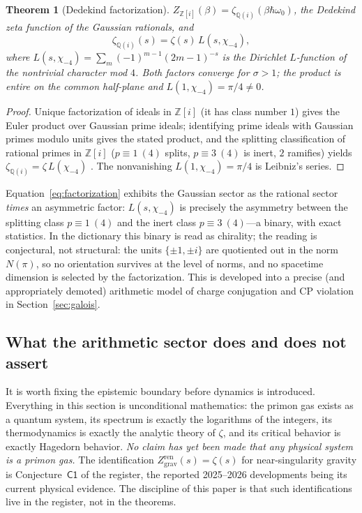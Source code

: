 \documentclass[11pt,a4paper]{article}
\theoremstyle{plain}
\newtheorem{theorem}{Theorem}[section]
\theoremstyle{definition}
\theoremstyle{remark}
\newcommand{\Zz}{\mathbb{Z}}
\newcommand{\Qq}{\mathbb{Q}}
\begin{document}
\begin{theorem}[Dedekind factorization]\label{thm:dedekind}
$Z_{\Zz[i]}(\beta)=\zeta_{\Qq(i)}(\beta\hbar\omega_{0})$, the Dedekind zeta function of the
Gaussian rationals, and
\begin{equation}\label{eq:factorization}
\zeta_{\Qq(i)}(s)=\zeta(s)\,L(s,\chi_{-4}),
\end{equation}
where $L(s,\chi_{-4})=\sum_{m}(-1)^{m-1}(2m-1)^{-s}$ is the Dirichlet $L$-function of the
nontrivial character mod $4$. Both factors converge for $\sigma>1$; the product is
entire on the common half-plane and $L(1,\chi_{-4})=\pi/4\neq 0$.
\end{theorem}

\begin{proof}
Unique factorization of ideals in $\Zz[i]$ (it has class number $1$) gives the Euler product
over Gaussian prime ideals; identifying prime ideals with Gaussian primes modulo units gives
the stated product, and the splitting classification of rational primes in $\Zz[i]$
($p\equiv1\ (4)$ splits, $p\equiv3\ (4)$ is inert, $2$ ramifies) yields
$\zeta_{\Qq(i)}=\zeta\,L(\chi_{-4})$ \cite{neukirch1999}. The nonvanishing
$L(1,\chi_{-4})=\pi/4$ is Leibniz's series.
\end{proof}

Equation~\eqref{eq:factorization} exhibits the Gaussian sector as the rational sector
\emph{times} an asymmetric factor: $L(s,\chi_{-4})$ is precisely the asymmetry between the
splitting class $p\equiv1\ (4)$ and the inert class $p\equiv3\ (4)$---a binary, with exact
statistics. In the dictionary this binary is read as chirality; the reading is conjectural,
not structural: the units $\{\pm1,\pm i\}$ are quotiented out in the norm $N(\pi)$, so no
orientation survives at the level of norms, and no spacetime dimension is selected by the
factorization. This is developed into a precise
(and appropriately demoted) arithmetic model of charge conjugation and CP violation in
Section~\ref{sec:galois}.

\subsection{What the arithmetic sector does and does not assert}

It is worth fixing the epistemic boundary before dynamics is introduced. Everything in this
section is unconditional mathematics: the primon gas exists as a quantum system, its spectrum
is exactly the logarithms of the integers, its thermodynamics is exactly the analytic theory
of $\zeta$, and its critical behavior is exactly Hagedorn behavior. \emph{No claim has yet
been made that any physical system is a primon gas.} The identification
$Z^{\mathrm{ren}}_{\mathrm{grav}}(s)=\zeta(s)$ for near-singularity gravity is
Conjecture~$\mathsf{C1}$ of the register, the reported 2025--2026 developments
\cite{hartnollyang2026} being its current physical evidence. The discipline of this paper is
that such identifications live in the register, not in the theorems.
\end{document}
